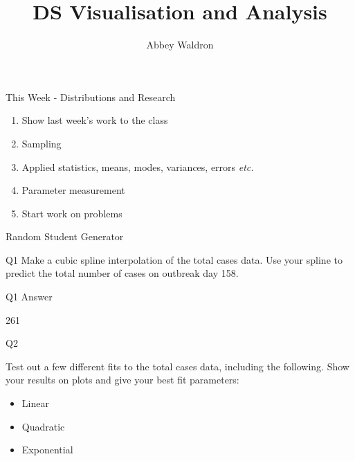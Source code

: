 \documentclass{beamer}
\newif\ifplacelogo
\begin{document}
\setlength{\unitlength}{1mm}
\title{DS Visualisation and Analysis}
\author[Abbey Waldron]{Abbey Waldron}
\date[October 2nd, 2015]{}





{
\placelogofalse
\begin{frame}
  \titlepage
\end{frame}
}



\begin{frame}{This Week - Distributions and Research}

\begin{enumerate}
\item Show last week's work to the class
\item Sampling
\item Applied statistics, means, modes, variances, errors \textit{etc.}
\item Parameter measurement
\item Start work on problems
\end{enumerate}

\end{frame}



\begin{frame}{Random Student Generator}

\end{frame}


\begin{frame}{Q1}
Make a cubic spline interpolation of the total cases data.  Use your spline to predict the total number of cases on outbreak day 158.
\end{frame}

\begin{frame}{Q1 Answer}

261

\end{frame}

\begin{frame}{Q2}

Test out a few different fits to the total cases data, including the following.  Show your results on plots and give your best fit parameters:
\begin{itemize}
\item Linear
\item Quadratic
\item Exponential
\end{itemize}

\end{frame}
\end{document}
